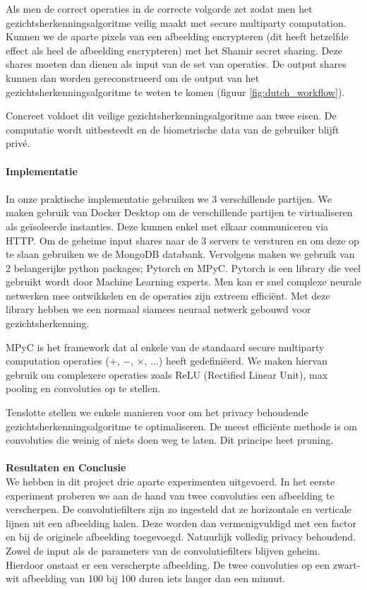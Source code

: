 Als men de correct operaties in de correcte volgorde zet zodat men het gezichtsherkenningsalgoritme veilig maakt met secure multiparty computation. Kunnen we de aparte pixels van een afbeelding encrypteren (dit heeft hetzelfde effect als heel de afbeelding encrypteren) met het Shamir secret sharing. Deze shares moeten dan dienen als input van de set van operaties. De output shares kunnen dan worden gereconstrueerd om de output van het gezichtsherkenningsalgoritme te weten te komen (figuur \ref{fig:dutch_workflow}).

Concreet voldoet dit veilige gezichtsherkenningsalgoritme aan twee eisen. De computatie wordt uitbesteedt en de biometrische data van de gebruiker blijft priv\'e.\\\\

\textbf{\Large{Implementatie}}\\\\
In onze praktische implementatie gebruiken we 3 verschillende partijen. We maken gebruik van Docker Desktop om de verschillende partijen te virtualiseren als ge\"isoleerde instanties. Deze kunnen enkel met elkaar communiceren via HTTP. Om de geheime input shares naar de 3 servers te versturen en om deze op te slaan gebruiken we de MongoDB databank. Vervolgens maken we gebruik van 2 belangerijke python packages; Pytorch en MPyC. Pytorch is een library die veel gebruikt wordt door Machine Learning experts. Men kan er snel complexe neurale netwerken mee ontwikkelen en de operaties zijn extreem effici\"ent. Met deze library hebben we een normaal siamees neuraal netwerk gebouwd voor gezichtsherkenning.

MPyC is het framework dat al enkele van de standaard secure multiparty computation operaties ($+$, $-$, $\times$, ...) heeft gedefini\"eerd. We maken hiervan gebruik om complexere operaties zoals ReLU (Rectified Linear Unit), max pooling en convoluties op te stellen.

Tenslotte stellen we enkele manieren voor om het privacy behoudende gezichtsherkenningsalgoritme te optimaliseren. De meest effici\"ente methode is om convoluties die weinig of niets doen weg te laten. Dit principe heet pruning.\\\\

\textbf{\Large{Resultaten en Conclusie}}\\
We hebben in dit project drie aparte experimenten uitgevoerd. In het eerste experiment proberen we aan de hand van twee convoluties een afbeelding te verscherpen. De convolutiefilters zijn zo ingesteld dat ze horizontale en verticale lijnen uit een afbeelding halen. Deze worden dan vermenigvuldigd met een factor en bij de originele afbeelding toegevoegd. Natuurlijk volledig privacy behoudend. Zowel de input als de parameters van de convolutiefilters blijven geheim. Hierdoor onstaat er een verscherpte afbeelding. De twee convoluties op een zwart-wit afbeelding van 100 bij 100 duren iets langer dan een minuut.

